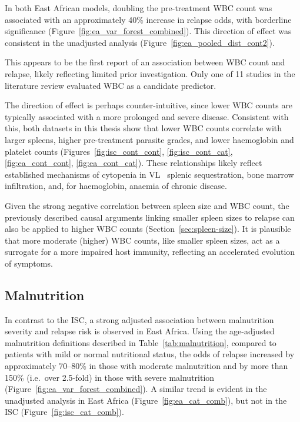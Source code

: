 In both East African models, doubling the pre-treatment WBC count was associated with an approximately 40\% increase in relapse odds, with borderline significance (Figure~\ref{fig:ea_var_forest_combined}). This direction of effect was consistent in the unadjusted analysis (Figure~\ref{fig:ea_pooled_dist_cont2}).

This appears to be the first report of an association between WBC count and relapse, likely reflecting limited prior investigation. Only one of 11 studies in the literature review evaluated WBC as a candidate predictor\cite{kajaia2011}.

The direction of effect is perhaps counter-intuitive, since lower WBC counts are typically associated with a more prolonged and severe disease\cite{pareyn2025,burza2018}. Consistent with this, both datasets in this thesis show that lower WBC counts correlate with larger spleens, higher pre-treatment parasite grades, and lower haemoglobin and platelet counts (Figures~\ref{fig:isc_cont_cont}, \ref{fig:isc_cont_cat}, \ref{fig:ea_cont_cont}, \ref{fig:ea_cont_cat}). These relationships likely reflect established mechanisms of cytopenia in VL \textemdash\ splenic sequestration, bone marrow infiltration, and, for haemoglobin, anaemia of chronic disease\cite{varma2010,shiferaw2021}.

Given the strong negative correlation between spleen size and WBC count, the previously described causal arguments linking smaller spleen sizes to relapse can also be applied to higher WBC counts (Section~\ref{sec:spleen-size}). It is plausible that more moderate (higher) WBC counts, like smaller spleen sizes, act as a surrogate for a more impaired host immunity, reflecting an accelerated evolution of symptoms.

\subsection{Malnutrition}

In contrast to the ISC, a strong adjusted association between malnutrition severity and relapse risk is observed in East Africa. Using the age-adjusted malnutrition definitions described in Table~\ref{tab:malnutrition}, compared to patients with mild or normal nutritional status, the odds of relapse increased by approximately 70--80\% in those with moderate malnutrition and by more than 150\% (i.e.\ over 2.5-fold) in those with severe malnutrition (Figure~\ref{fig:ea_var_forest_combined}). A similar trend is evident in the unadjusted analysis in East Africa (Figure~\ref{fig:ea_cat_comb}), but not in the ISC (Figure~\ref{fig:isc_cat_comb}).

